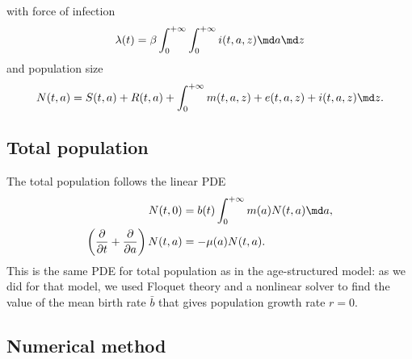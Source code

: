 \documentclass{jpmarticle}
\begin{document}
with force of infection
\begin{equation}
  \lambda(t) =
  \beta
  \int_0^{+\infty} \int_0^{+\infty}
  i(t, a, z)
  \md a \md z
\end{equation}
and population size
\begin{equation}
  N(t, a) =
  S(t, a) + R(t, a)
  + \int_0^{+\infty} m(t, a, z) + e(t, a, z) + i(t, a, z) \md z.
\end{equation}


\subsection{Total population}

The total population follows the linear PDE
\begin{equation}
  \begin{split}
    N(t, 0) &=
    b(t) \int_0^{+\infty} m(a) N(t, a) \md a,
    \\
    \left(\frac{\partial}{\partial t}
      + \frac{\partial}{\partial a}\right)
    N(t, a) &=
    - \mu(a) N(t, a).
  \end{split}
\end{equation}
This is the same PDE for total population as in the age-structured
model: as we did for that model, we used Floquet theory and a
nonlinear solver to find the value of the mean birth rate $\bar{b}$
that gives population growth rate $r = 0$.


\subsection{Numerical method}


\printbibliography
\end{document}
